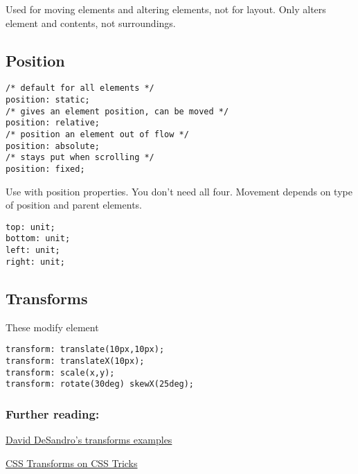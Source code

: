 Used for moving elements and altering elements, not for layout. Only alters element and contents, not surroundings.


\subsection{Position}

\begin{verbatim}
/* default for all elements */
position: static;
/* gives an element position, can be moved */
position: relative;
/* position an element out of flow */
position: absolute;
/* stays put when scrolling */
position: fixed;
\end{verbatim}


Use with position properties. You don't need all four. Movement depends on type of position and parent elements.

\begin{verbatim}
top: unit;
bottom: unit;
left: unit;
right: unit;
\end{verbatim}


\subsection{Transforms}

These modify element

\begin{verbatim}
transform: translate(10px,10px);
transform: translateX(10px);
transform: scale(x,y);
transform: rotate(30deg) skewX(25deg);
\end{verbatim}

\subsubsection{Further reading:}

\href{http://desandro.github.io/3dtransforms/}{David DeSandro's transforms examples}

\href{https://css-tricks.com/almanac/properties/t/transform/}{CSS Transforms on CSS Tricks}
